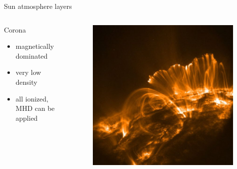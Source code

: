 \documentclass{beamer}
\begin{document}
\begin{frame}[t]{Sun atmosphere layers}
\begin{columns}[c]
    \begin{column}{0.6\textwidth}
		Corona
        \begin{itemize}
					\item magnetically dominated 
					\item very low density
					\item all ionized, MHD can be applied
        \end{itemize}
    \end{column}
    \begin{column}{0.5\textwidth}
			\begin{figure}[t]
			 \centering
			 \includegraphics[scale=0.11]{corona.jpg}
			\end{figure}
    \end{column}
\end{columns}

\end{frame}
\end{document}
